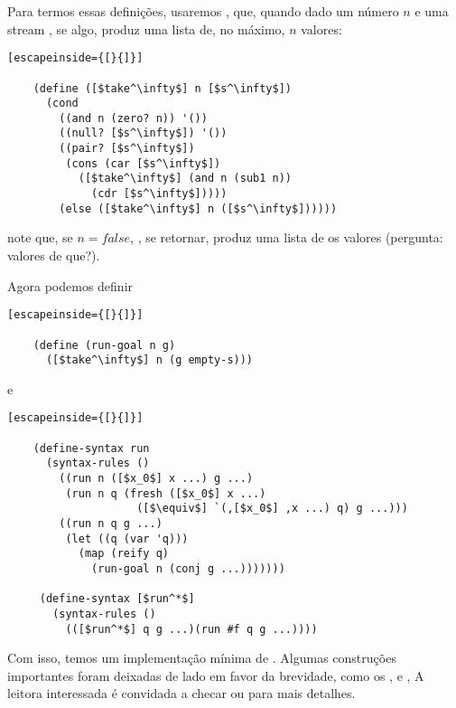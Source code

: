 \documentclass{article}
\begin{document}
  Para termos essas definições, usaremos ,
  que, quando dado um número $n$ e uma stream , se
  algo, produz uma lista de, no máximo, $n$ valores:

  \begin{lstlisting}[escapeinside={[}{]}]

    (define ([$take^\infty$] n [$s^\infty$])
      (cond
        ((and n (zero? n)) '())
        ((null? [$s^\infty$]) '())
        ((pair? [$s^\infty$])
         (cons (car [$s^\infty$])
           ([$take^\infty$] (and n (sub1 n))
             (cdr [$s^\infty$]))))
        (else ([$take^\infty$] n ([$s^\infty$])))))

  \end{lstlisting}

  \noindent note que, se $n = false$, , se
  retornar, produz uma lista de  os valores (pergunta:
  valores de que?).

  Agora podemos definir

  \begin{lstlisting}[escapeinside={[}{]}]

    (define (run-goal n g)
      ([$take^\infty$] n (g empty-s)))

  \end{lstlisting}

  \noindent e

  \begin{lstlisting}[escapeinside={[}{]}]

    (define-syntax run
      (syntax-rules ()
        ((run n ([$x_0$] x ...) g ...)
         (run n q (fresh ([$x_0$] x ...)
                    ([$\equiv$] `(,[$x_0$] ,x ...) q) g ...)))
        ((run n q g ...)
         (let ((q (var 'q)))
           (map (reify q)
             (run-goal n (conj g ...)))))))

     (define-syntax [$run^*$]
       (syntax-rules ()
         (([$run^*$] q g ...)(run #f q g ...))))

  \end{lstlisting}

  Com isso, temos um implementação mínima de
  . Algumas construções importantes foram
  deixadas de lado em favor da brevidade, como os
  ,  e ,
  A leitora interessada é convidada a checar \cite{will} ou
  \cite{kanren} para mais detalhes.
  
  
\end{document}
